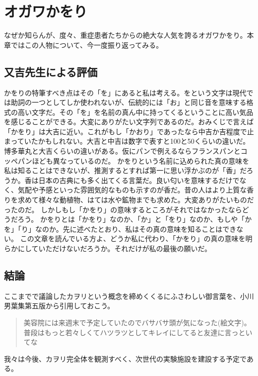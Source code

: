 \chapter{オガワかをり}
\label{chap:Kawori}

なぜか知らんが、度々、重症患者たちからの絶大な人気を誇るオガワかをり。本章ではこの人物について、今一度振り返ってみる。




\section{又吉先生による評価}
かをりの特筆すべき点はその「を」にあると私は考える。をという文字は現代では助詞の一つとしてしか使われないが、伝統的には「お」と同じ音を意味する格式の高い文字だ。その「を」を名前の真ん中に持ってくるということに高い気品を感じることができる。大変にありがたい文字列であるのだ。おみくじで言えば「かをり」は大吉に近い。これがもし「かおり」であったなら中吉か吉程度で止まっていたかもしれない。大吉と中吉は数字で表すと100と50くらいの違いだ。博多華丸と大吉くらいの違いがある。仮にパンで例えるならフランスパンとコッペパンほども異なっているのだ。
かをりという名前に込められた真の意味を私は知ることはできないが、推測するとすれば第一に思い浮かぶのが「香」だろうか。香は日本の古典にも多く出てくる言葉だ。良い匂いを意味するだけでなく、気配や予感といった雰囲気的なものも示すのが香だ。昔の人はより上質な香りを求めて様々な動植物、はては水や鉱物までも求めた。大変ありがたいものだったのだ。
しかしもし「かをり」の意味するところがそれではなかったならどうだろう。
かをりとは「かをり」なのか、「か」と「をり」なのか、もしや「かを」「り」なのか。先に述べたとおり、私はその真の意味を知ることはできない。
この文章を読んでいる方よ、どうか私に代わり、「かをり」の真の意味を明らかにしていただけないだろうか。それだけが私の最後の願いだ。

\section{結論}
ここまでで議論したカヲリという概念を締めくくるにふさわしい御言葉を、小川男葉集第五版から引用しておこう。
\begin{quote}
美容院には来週末で予定していたのでバサバサ頭が気になった(絵文字)。普段はもっと若々しくてハツラツとしてキレイにしてると友達に言っといてな
\end{quote}
我々は今後、カヲリ完全体を観測すべく、次世代の実験施設を建設する予定である。
